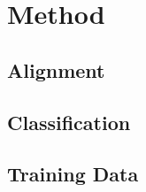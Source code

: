 \chapter{Method} %
\label{cha:method}
\section{Alignment} %
\label{sec:alignment}


\section{Classification} %
\label{sec:classification}


\section{Training Data} %
\label{sec:training_data}


